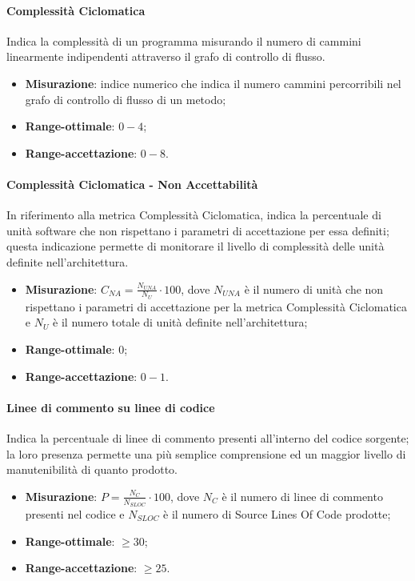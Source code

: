 \paragraph{Complessità Ciclomatica}
\label{complCiclom}
Indica la complessità di un programma misurando il numero di cammini linearmente indipendenti attraverso il grafo di controllo di flusso.
\begin{itemize}
\item \textbf{Misurazione}: indice numerico che indica il numero cammini percorribili nel grafo di controllo di flusso di un metodo;
\item \textbf{Range-ottimale}: $0 - 4$;
\item \textbf{Range-accettazione}: $0 - 8$.
\end{itemize}
\paragraph{Complessità Ciclomatica - Non Accettabilità}
\label{complCiclomNA}
In riferimento alla metrica Complessità Ciclomatica, indica la percentuale di unità software che non rispettano i parametri di accettazione per essa definiti; questa indicazione permette di monitorare il livello di complessità delle unità definite nell'architettura.
\begin{itemize}
\item \textbf{Misurazione}: $C_{NA}=\frac{N_{UNA}}{N_{U}} \cdot 100$, dove $N_{UNA}$ è il numero di unità che non rispettano i parametri di accettazione per la metrica Complessità Ciclomatica e $N_{U}$ è il numero totale di unità definite nell'architettura;
\item \textbf{Range-ottimale}: $0$;
\item \textbf{Range-accettazione}: $0 - 1$.
\end{itemize}
\paragraph{Linee di commento su linee di codice}
\label{lineeCommento}
Indica la percentuale di linee di commento presenti all'interno del codice sorgente; la loro presenza permette una più semplice comprensione ed un maggior livello di manutenibilità di quanto prodotto.
\begin{itemize}
\item \textbf{Misurazione}: $P=\frac{N_{C}}{N_{SLOC}} \cdot 100$, dove $N_{C}$ è il numero di linee di commento presenti nel codice e $N_{SLOC}$ è il numero di Source Lines Of Code prodotte;
\item \textbf{Range-ottimale}: $\geq 30$;
\item \textbf{Range-accettazione}: $\geq 25$.
\end{itemize}
